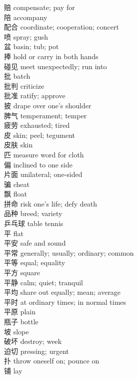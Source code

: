 赔 \quad compensate; pay for\\
陪 \quad accompany\\
配合 \quad coordinate; cooperation; concert\\
喷 \quad spray; gush\\
盆 \quad basin; tub; pot\\
捧 \quad hold or carry in both hands\\
碰见 \quad meet unexpectedly; run into\\
批 \quad batch\\
批判 \quad criticize\\
批准 \quad ratify; approve\\
披 \quad drape over one's shoulder\\
脾气 \quad temperament; temper\\
疲劳 \quad exhausted; tired\\
皮 \quad skin; peel; tegument\\
皮肤 \quad skin\\
匹 \quad measure word for cloth\\
偏 \quad inclined to one side\\
片面 \quad unilateral; one-sided\\
骗 \quad cheat\\
飘 \quad float\\
拼命 \quad risk one's life; defy death\\
品种 \quad breed; variety\\
乒乓球 \quad table tennis\\
平 \quad flat\\
平安 \quad safe and sound\\
平常 \quad generally; usually; ordinary; common\\
平等 \quad equal; equality\\
平方 \quad square\\
平静 \quad calm; quiet; tranquil\\
平均 \quad share out equally; mean; average\\
平时 \quad at ordinary times; in normal times\\
平原 \quad plain\\
瓶子 \quad bottle\\
坡 \quad slope\\
破坏 \quad destroy; week\\
迫切 \quad pressing; urgent\\
扑 \quad throw oneself on; pounce on\\
铺 \quad lay\\
